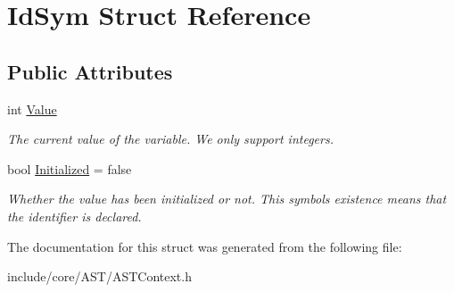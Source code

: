 \hypertarget{struct_id_sym}{}\section{Id\+Sym Struct Reference}
\label{struct_id_sym}
\subsection*{Public Attributes}
\begin{DoxyCompactItemize}
\item 
\mbox{\label{struct_id_sym_a02b749ab3da91639af292e659cdb4aa1}} 
int \mbox{\hyperlink{struct_id_sym_a02b749ab3da91639af292e659cdb4aa1}{Value}}
\begin{DoxyCompactList}\small\item\em The current value of the variable. We only support integers. \end{DoxyCompactList}\item 
\mbox{\label{struct_id_sym_a2ccf0f673cff5b9dd936d23519848397}} 
bool \mbox{\hyperlink{struct_id_sym_a2ccf0f673cff5b9dd936d23519848397}{Initialized}} = false
\begin{DoxyCompactList}\small\item\em Whether the value has been initialized or not. This symbol\textquotesingle{}s existence means that the identifier is declared. \end{DoxyCompactList}\end{DoxyCompactItemize}


The documentation for this struct was generated from the following file\+:\begin{DoxyCompactItemize}
\item 
include/core/\+A\+S\+T/A\+S\+T\+Context.\+h\end{DoxyCompactItemize}
